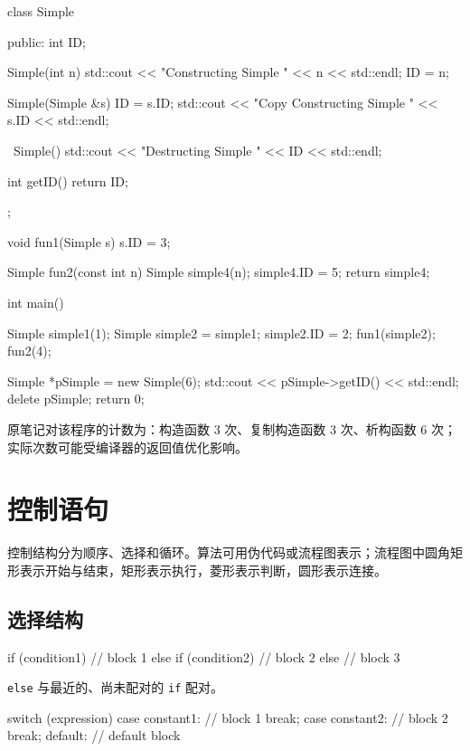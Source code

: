 \documentclass[UTF8,fontset=fandol,zihao=5]{ctexart}
\newcommand{\code}[1]{\texttt{#1}}
\begin{document}
\begin{cppcode}[构造、复制与析构]
class Simple {
public:
    int ID;

    Simple(int n) {
        std::cout << "Constructing Simple " << n << std::endl;
        ID = n;
    }

    Simple(Simple &s) {
        ID = s.ID;
        std::cout << "Copy Constructing Simple " << s.ID << std::endl;
    }

    ~Simple() {
        std::cout << "Destructing Simple " << ID << std::endl;
    }

    int getID() {
        return ID;
    }
};

void fun1(Simple s) {
    s.ID = 3;
}

Simple fun2(const int n) {
    Simple simple4(n);
    simple4.ID = 5;
    return simple4;
}

int main() {
    Simple simple1(1);
    Simple simple2 = simple1;
    simple2.ID = 2;
    fun1(simple2);
    fun2(4);

    Simple *pSimple = new Simple(6);
    std::cout << pSimple->getID() << std::endl;
    delete pSimple;
    return 0;
}
\end{cppcode}

原笔记对该程序的计数为：构造函数 $3$ 次、复制构造函数 $3$ 次、析构函数 $6$ 次；实际次数可能受编译器的返回值优化影响。

\section{控制语句}

控制结构分为顺序、选择和循环。算法可用伪代码或流程图表示；流程图中圆角矩形表示开始与结束，矩形表示执行，菱形表示判断，圆形表示连接。

\subsection{选择结构}

\begin{cppcode}[if--else]
if (condition1) {
    // block 1
} else if (condition2) {
    // block 2
} else {
    // block 3
}
\end{cppcode}

\code{else} 与最近的、尚未配对的 \code{if} 配对。

\begin{cppcode}[switch]
switch (expression) {
case constant1:
    // block 1
    break;
case constant2:
    // block 2
    break;
default:
    // default block
}
\end{cppcode}
\end{document}
